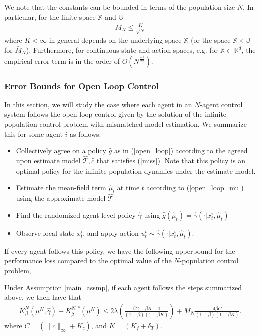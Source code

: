\documentclass[twoside,11pt]{article}
\begin{document}
\begin{remark}
We note that the constants can be bounded in terms of the population size $N$. In particular, for the finite space $\mathds{X}$ and $\mathds{U}$ 
\begin{align*}
M_N\leq  \frac{K}{\sqrt{N}}
\end{align*}
where $K<\infty$ in general depends on the  underlying space $\mathds{X}$ (or the space $\mathds{X}\times\mathds{U}$ for $\bar{M}_N$). Furthermore, for continuous state and action spaces, e.g. for $\mathds{X}\subset \mathds{R}^d$, the empirical error term is in the order of $O(N^{\frac{-1}{2d}})$.
\end{remark}

\subsubsection{Error Bounds for Open Loop Control}
In this section, we will study the case where each agent in an $N$-agent control system follows the open-loop control given by the solution of the infinite population control problem with mismatched model estimation. We summarize this for some agent $i$ as follows:
\begin{itemize}
\item Collectively agree on a policy $\hat{g}$ as in (\ref{open_loop}) according to the agreed upon estimate model $\hat{\mathcal{T}},\hat{c}$ that satisfies (\ref{miss}). Note that this policy is an optimal policy for the infinite population dynamics under the estimate model.
\item Estimate the mean-field term $\hat{\mu}_t$ at time $t$ according to (\ref{open_loop_mu}) using the approximate model $\hat{\mathcal{T}}$
\item Find the randomized agent level policy $\hat{\gamma}$ using $\hat{g}(\hat{\mu}_t) = \hat{\gamma}(\cdot|x_t^i,\hat{\mu}_t)$
\item Observe local state $x_t^i$, and apply action $u_t^t\sim\hat{\gamma}(\cdot|x_t^i,\hat{\mu}_t)$.
\end{itemize}
If every agent follows this policy, we have the following upperbound for the performance loss compared to the optimal value of the $N$-population control problem,
\begin{theorem}
Under Assumption \ref{main_assmp}, if each agent follows the steps summarized above, we then have that
\begin{align*}
K_\beta^N(\mu^N,\hat{\gamma}) - K_\beta^{N,*}(\mu^N)  \leq 2 \lambda\left( \frac{\beta C- \beta K +1}{(1-\beta)(1-\beta K)}  \right)  + M_N \frac{4\beta C}{(1-\beta)(1-\beta K)}.
\end{align*}
where $C=(\|c\|_\infty + K_c)$, and $K=(K_f + \delta_T)$.
\end{theorem}
\end{document}
